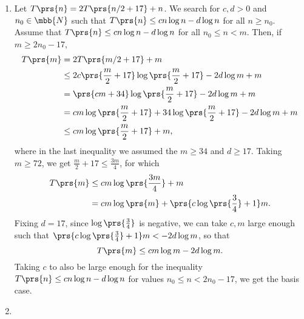 \documentclass[oneside]{scrbook}
\theoremstyle{definition}
\begin{document}
\begin{exercise}
\begin{enumerate}[label=\alph*.]
        \item %

        Let $T\prs{n} = 2 T\prs{n/2 + 17} + n$.
        We search for $c,d > 0$ and $n_0 \in \mbb{N}$ such that $T\prs{n} \leq c n \log n - d \log n$ for all $n \geq n_0$.
        Assume that $T\prs{n} \leq c n\log n - d \log n$ for all $n_0 \leq n < m$. Then, if $m \geq 2 n_0 - 17$,
        \begin{align*}
            T\prs{m} &= 2 T\prs{m/2+17} + m
            \\&\leq 2 c \prs{\frac{m}{2}+17} \log\prs{\frac{m}{2} + 17} - 2 d \log m + m
            \\&= \prs{cm+34} \log \prs{\frac{m}{2} + 17} - 2 d \log m + m
            \\&= cm \log\prs{\frac{m}{2} + 17} + 34 \log \prs{\frac{m}{2} + 17} - 2d \log m + m
            \\&\leq cm \log\prs{\frac{m}{2} + 17} + m \text{,}
        \end{align*}
        where in the last inequality we assumed the $m \geq 34$ and $d \geq 17$.
        Taking $m \geq 72$, we get $\frac{m}{2} + 17 \leq \frac{3m}{4}$, for which
        \begin{align*}
            T\prs{m} &\leq cm \log\prs{\frac{3 m}{4}} + m
            \\&=
            cm \log\prs{m} + \prs{c \log\prs{\frac{3}{4}} + 1} m \text{.}
        \end{align*}
        Fixing $d = 17$, since $\log\prs{\frac{3}{4}}$ is negative, we can take $c, m$ large enough such that $\prs{c \log\prs{\frac{3}{4}} + 1} m < -2d \log m$, so that
        \[T\prs{m} \leq cm \log m - 2d \log m \text{.}\]
        Taking $c$ to also be large enough for the inequality $T\prs{n} \leq cn \log n - d \log n$ for values $n_0 \leq n < 2n_0 - 17$, we get the basis case.
        
        \item %


\end{enumerate}
\end{exercise}
\end{document}
